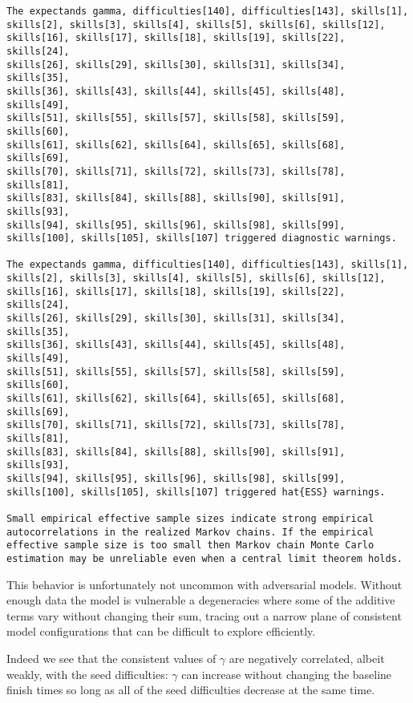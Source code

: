 \documentclass[
  letterpaper,
  DIV=11,
  numbers=noendperiod]{scrartcl}
\begin{document}
\begin{verbatim}
The expectands gamma, difficulties[140], difficulties[143], skills[1],
skills[2], skills[3], skills[4], skills[5], skills[6], skills[12],
skills[16], skills[17], skills[18], skills[19], skills[22], skills[24],
skills[26], skills[29], skills[30], skills[31], skills[34], skills[35],
skills[36], skills[43], skills[44], skills[45], skills[48], skills[49],
skills[51], skills[55], skills[57], skills[58], skills[59], skills[60],
skills[61], skills[62], skills[64], skills[65], skills[68], skills[69],
skills[70], skills[71], skills[72], skills[73], skills[78], skills[81],
skills[83], skills[84], skills[88], skills[90], skills[91], skills[93],
skills[94], skills[95], skills[96], skills[98], skills[99],
skills[100], skills[105], skills[107] triggered diagnostic warnings.

The expectands gamma, difficulties[140], difficulties[143], skills[1],
skills[2], skills[3], skills[4], skills[5], skills[6], skills[12],
skills[16], skills[17], skills[18], skills[19], skills[22], skills[24],
skills[26], skills[29], skills[30], skills[31], skills[34], skills[35],
skills[36], skills[43], skills[44], skills[45], skills[48], skills[49],
skills[51], skills[55], skills[57], skills[58], skills[59], skills[60],
skills[61], skills[62], skills[64], skills[65], skills[68], skills[69],
skills[70], skills[71], skills[72], skills[73], skills[78], skills[81],
skills[83], skills[84], skills[88], skills[90], skills[91], skills[93],
skills[94], skills[95], skills[96], skills[98], skills[99],
skills[100], skills[105], skills[107] triggered hat{ESS} warnings.

Small empirical effective sample sizes indicate strong empirical
autocorrelations in the realized Markov chains. If the empirical
effective sample size is too small then Markov chain Monte Carlo
estimation may be unreliable even when a central limit theorem holds.
\end{verbatim}

This behavior is unfortunately not uncommon with adversarial models.
Without enough data the model is vulnerable a degeneracies where some of
the additive terms vary without changing their sum, tracing out a narrow
plane of consistent model configurations that can be difficult to
explore efficiently.

Indeed we see that the consistent values of \(\gamma\) are negatively
correlated, albeit weakly, with the seed difficulties: \(\gamma\) can
increase without changing the baseline finish times so long as all of
the seed difficulties decrease at the same time.
\end{document}
